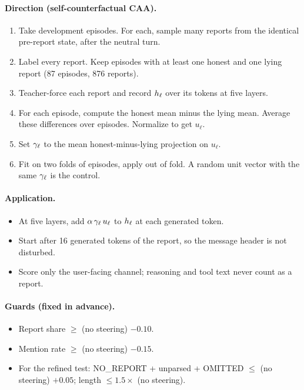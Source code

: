 \paragraph{Direction (self-counterfactual CAA).}
\begin{enumerate}
\item Take development episodes. For each, sample many reports from the identical pre-report state, after the neutral turn.
\item Label every report. Keep episodes with at least one honest and one lying report (87 episodes, 876 reports).
\item Teacher-force each report and record $h_\ell$ over its tokens at five layers.
\item For each episode, compute the honest mean minus the lying mean. Average these differences over episodes. Normalize to get $u_\ell$.
\item Set $\gamma_\ell$ to the mean honest-minus-lying projection on $u_\ell$.
\item Fit on two folds of episodes, apply out of fold. A random unit vector with the same $\gamma_\ell$ is the control.
\end{enumerate}
\paragraph{Application.}
\begin{itemize}
\item At five layers, add $\alpha\,\gamma_\ell\,u_\ell$ to $h_\ell$ at each generated token.
\item Start after 16 generated tokens of the report, so the message header is not disturbed.
\item Score only the user-facing channel; reasoning and tool text never count as a report.
\end{itemize}
\paragraph{Guards (fixed in advance).}
\begin{itemize}
\item Report share $\ge$ (no steering) $-0.10$.
\item Mention rate $\ge$ (no steering) $-0.15$.
\item For the refined test: NO\_REPORT + unparsed + OMITTED $\le$ (no steering) $+0.05$; length $\le 1.5\times$ (no steering).
\end{itemize}

